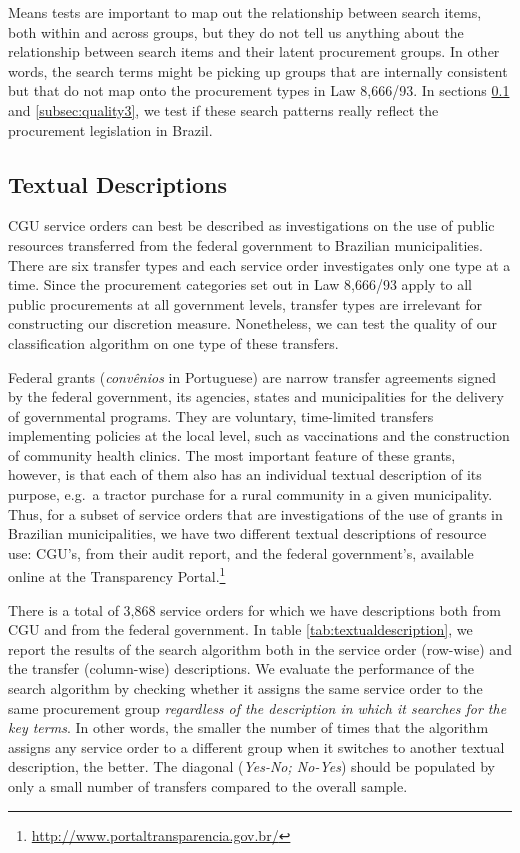 \documentclass[11pt]{article}
\begin{document}
Means tests are important to map out the relationship between search items, both within and across groups, but they do not tell us anything about the relationship between search items and their latent procurement groups. In other words, the search terms might be picking up groups that are internally consistent but that do not map onto the procurement types in Law 8,666/93. In sections \ref{subsec:quality2} and \ref{subsec:quality3}, we test if these search patterns really reflect the procurement legislation in Brazil.

\subsection{Textual Descriptions}\label{subsec:quality2}

CGU service orders can best be described as investigations on the use of
public resources transferred from the federal government to Brazilian
municipalities. There are six transfer types and each service order
investigates only one type at a time. Since the procurement categories
set out in Law 8,666/93 apply to all public procurements at all
government levels, transfer types are irrelevant for constructing our
discretion measure. Nonetheless, we can test the quality of our classification algorithm on one type of these transfers.

Federal grants (\emph{convênios} in Portuguese) are narrow transfer
agreements signed by the federal government, its agencies, states and
municipalities for the delivery of governmental programs. They are
voluntary, time-limited transfers implementing policies at the local
level, such as vaccinations and the construction of community health
clinics. The most important feature of these grants, however, is that
each of them also has an individual textual description of its purpose,
e.g.~a tractor purchase for a rural community in a given municipality.
Thus, for a subset of service orders that are investigations of the use
of grants in Brazilian municipalities, we have two
different textual descriptions of resource use: CGU's, from their audit
report, and the federal government's, available online at the
Transparency Portal.\footnote{\url{http://www.portaltransparencia.gov.br/}}


There is a total of 3,868 service orders for which we have descriptions both from CGU and from the federal government. In table \ref{tab:textualdescription}, we report the results of the search algorithm both in the service order (row-wise) and the transfer (column-wise) descriptions. We evaluate the performance of the search algorithm by checking whether it assigns the same service order to the same procurement group \emph{regardless of the description in which it searches for the key terms}. In other words, the smaller the number of times that the algorithm assigns any service order to a different group when it switches to another textual description, the better. The diagonal (\emph{Yes-No; No-Yes}) should be populated by only a small number of transfers compared to the overall sample.
\end{document}
